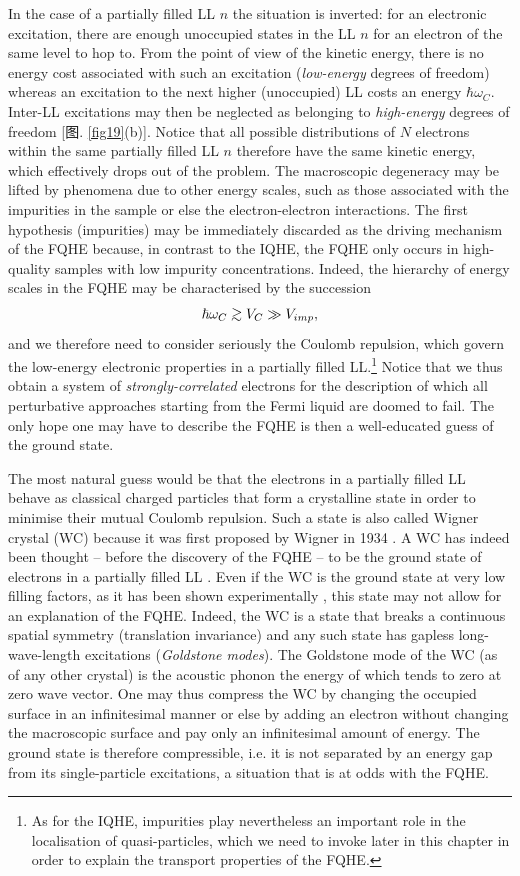 \documentclass[10pt]{book}
\def\gtrsim{\mathrel{\raise.4ex\hbox{$>$}\kern-0.8em\lower.7ex\hbox{$\sim$}}}
\newcommand{\beq}{\begin{equation}}
\newcommand{\eeq}{\end{equation}}
\begin{document}
In the case of a partially filled LL $n$ the situation is inverted: for an electronic excitation,
there are enough unoccupied states in the LL $n$ for an electron of the same level to hop to. 
From the point of view of the kinetic energy, there is no energy cost associated with such an excitation
({\sl low-energy} degrees of freedom) whereas an excitation to
the next higher (unoccupied) LL costs an energy $\hbar\omega_C$. Inter-LL excitations may then be neglected as belonging 
to {\sl high-energy} degrees of freedom [图. \ref{fig19}(b)]. Notice that all possible
distributions of $N$ electrons within the same partially filled LL $n$ therefore have the same kinetic energy, which
effectively drops out of the problem. The macroscopic degeneracy may be lifted by phenomena due to other energy scales, such
as those associated with the impurities in the sample or else the electron-electron interactions. The first hypothesis (impurities)
may be immediately discarded as the driving mechanism of the FQHE because, in contrast to the IQHE, the FQHE only occurs in
high-quality samples with low impurity concentrations. 
Indeed, the hierarchy of energy scales in the FQHE may be characterised by the succession
\beq\label{EnScales}
\hbar\omega_C\gtrsim V_C \gg V_{imp},
\eeq
and we therefore need to consider seriously the Coulomb repulsion, which govern the low-energy electronic properties in a
partially filled LL.\footnote{As for the IQHE, impurities play nevertheless 
an important role in the localisation of quasi-particles, which we need to invoke later in this chapter in order to explain the 
transport properties of the FQHE.}
Notice that we thus obtain a system of {\sl strongly-correlated} electrons for the description of which all perturbative approaches 
starting from the Fermi liquid are doomed to fail. The only hope one may have to describe the FQHE is then a well-educated guess
of the ground state. 

The most natural guess would be that the electrons in a partially filled LL behave as classical charged particles that form
a crystalline state in order to minimise their mutual Coulomb repulsion. Such a state  is also called Wigner crystal (WC) because it
was first proposed by Wigner in 1934 \cite{wigner}. A WC has indeed been thought -- before the discovery of the FQHE -- to be
the ground state of electrons in a partially filled LL \cite{FPA}. Even if the WC is the ground state at very low
filling factors, as it has been shown experimentally \cite{glatt}, this state may not allow for an explanation of the FQHE. Indeed,
the WC is a state that breaks a continuous spatial symmetry (translation invariance) and any such state has gapless
long-wave-length excitations ({\sl Goldstone modes}). The Goldstone mode of the WC (as of any other crystal) is the acoustic 
phonon the energy of which tends to zero at zero wave vector. One may thus compress the WC by changing the occupied surface 
in an infinitesimal manner or else by adding an electron without changing the macroscopic surface and pay only an infinitesimal
amount of energy. The ground state is therefore compressible, i.e. it is
not separated by an energy gap from its single-particle excitations, a situation
that is at odds with the FQHE.
\end{document}
